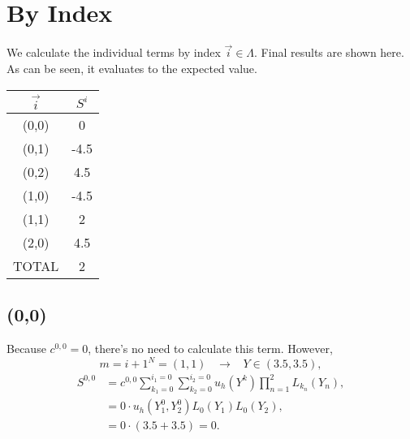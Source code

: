 \documentclass[11pt]{article}
\begin{document}
\section{By Index}
We calculate the individual terms by index $\vec i\in\Lambda$.  Final results are shown here.  As can be seen, it evaluates to the expected value.
\begin{table}[H]
\centering
\begin{tabular}{c c}
$\vec i$ & $S^i$ \\ \hline
(0,0) & 0 \\
(0,1) & -4.5 \\
(0,2) & 4.5 \\
(1,0) & -4.5 \\
(1,1) & 2 \\
(2,0) & 4.5 \\ \hline
TOTAL & 2
\end{tabular}
\end{table}

\subsection{(0,0)}
Because $c^{0,0}=0$, there's no need to calculate this term.  However,
\begin{equation}
m=i+{1}^N = (1,1) \hspace{10pt} \to \hspace{10pt} Y\in(3.5,3.5),
\end{equation}
\begin{align}
S^{0,0}&=c^{0,0}\sum_{k_1=0}^{i_1=0}\sum_{k_2=0}^{i_2=0}u_h(Y^k)\prod_{n=1}^2 L_{k_n}(Y_n),\\
  &= 0\cdot u_h(Y^0_1,Y^0_2)L_0(Y_1)L_0(Y_2),\\
  &=0\cdot (3.5+3.5)=0.
\end{align}
\end{document}

